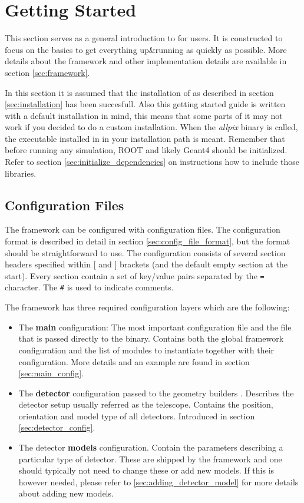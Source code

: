 \section{Getting Started}
This section serves as a general introduction to \apsq for users. It is constructed to focus on the basics to get everything up\&running as quickly as possible. More details about the framework and other implementation details are available in section \ref{sec:framework}.

In this section it is assumed that the installation of \apsq as described in section \ref{sec:installation} has been succesfull. Also this getting started guide is written with a default installation in mind, this means that some parts of it may not work if you decided to do a custom installation. When the \textit{allpix} binary is called, the executable installed in  in your installation path is meant. Remember that before running any \apsq simulation, ROOT and likely Geant4 should be initialized. Refer to section \ref{sec:initialize_dependencies} on instructions how to include those libraries.

\subsection{Configuration Files}
\label{sec:configuration_files}
The framework can be configured with configuration files. The configuration format is described in detail in section \ref{sec:config_file_format}, but the format should be straightforward to use. The configuration consists of several section headers specified within $[$ and $]$ brackets (and the default empty section at the start). Every section contain a set of key/value pairs separated by the \texttt{=} character. The \texttt{\#} is used to indicate comments.

The framework has three required configuration layers which are the following:
\begin{itemize}
\item The \textbf{main} configuration: The most important configuration file and the file that is passed directly to the binary. Contains both the global framework configuration and the list of modules to instantiate together with their configuration. More details and an example are found in section \ref{sec:main_config}.
\item The \textbf{detector} configuration passed to the geometry builders . Describes the detector setup usually referred as the telescope. Contains the position, orientation and model type of all detectors. Introduced in section \ref{sec:detector_config}.
\item The detector \textbf{models} configuration. Contain the parameters describing a particular type of detector. These are shipped by the framework and one should typically not need to change these or add new models. If this is however needed, please refer to \ref{sec:adding_detector_model} for more details about adding new models.
\end{itemize}

